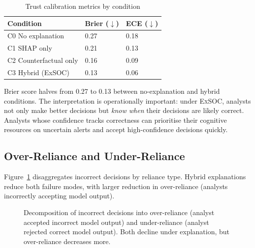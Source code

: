 \documentclass[sigconf,nonacm]{acmart}
\begin{document}
\begin{table}[h]
\caption{Trust calibration metrics by condition}
\label{tab:cal}
\small
\begin{tabularx}{\columnwidth}{@{}p{2.6cm}X X@{}}
\toprule
\textbf{Condition} & \textbf{Brier ($\downarrow$)} & \textbf{ECE ($\downarrow$)} \\
\midrule
C0 No explanation         & 0.27 & 0.18 \\
C1 SHAP only              & 0.21 & 0.13 \\
C2 Counterfactual only    & 0.16 & 0.09 \\
C3 Hybrid (ExSOC)         & 0.13 & 0.06 \\
\bottomrule
\end{tabularx}
\end{table}

Brier score halves from 0.27 to 0.13 between no-explanation and hybrid
conditions. The interpretation is operationally important: under
\textsc{ExSOC}, analysts not only make better decisions but \emph{know
when} their decisions are likely correct. Analysts whose confidence tracks
correctness can prioritise their cognitive resources on uncertain alerts
and accept high-confidence decisions quickly.

\subsection{Over-Reliance and Under-Reliance}

Figure~\ref{fig:reliance} disaggregates incorrect decisions by reliance
type. Hybrid explanations reduce both failure modes, with larger reduction
in over-reliance (analysts incorrectly accepting model output).

\begin{figure}[h]
\centering
{}
\caption{Decomposition of incorrect decisions into over-reliance (analyst
  accepted incorrect model output) and under-reliance (analyst rejected
  correct model output). Both decline under explanation, but over-reliance
  decreases more.}
\label{fig:reliance}
\end{figure}
\end{document}
